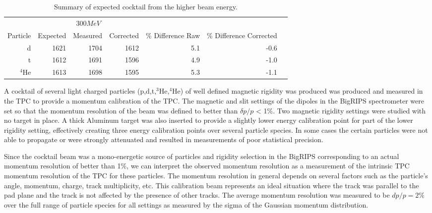 \begin{table*}\centering
{}
\begin{tabular}{@{}rrrrrrr@{}}\toprule
& \multicolumn{3}{c}{$300 MeV$}\\
\cmidrule{2-4}
Particle & Expected & Measured & Corrected & \% Difference Raw & \% Difference Corrected\\
\midrule
d   & 1621 & 1704 & 1612   &  5.1 & -0.6  \\
t   & 1612 & 1691 & 1596   &  4.9  & -1.0\\
${}^{4}$He   & 1613 & 1698 &  1595 & 5.3 & -1.1\\

\bottomrule
\end{tabular}
\caption{Summary of expected cocktail from the higher beam energy.}
\label{tb:cocktail300}
\end{table*}

A cocktail of several light charged particles (p,d,t,${}^{3}$He,${}^{4}$He) of well defined magnetic rigidity was produced was produced and measured in the TPC to provide a momentum calibration of the TPC. The magnetic and slit settings of the dipoles in the BigRIPS spectrometer were set so that the momentum resolution of the beam was defined to better than $\delta p/p$ < 1\%. Two magnetic rigidity settings were studied with no target in place. A thick Aluminum target was also inserted to provide a slightly lower energy calibration point for part of the lower rigidity setting, effectively creating three energy calibration points over several particle species. In some cases the certain particles were not able to propagate or were strongly attenuated and resulted in measurements of poor statistical precision. 

Since the cocktail beam was a mono-energetic source of particles and rigidity selection in the BigRIPS corresponding to an actual momentum resolution of better than 1\%, we can interpret the  observed momentum resolution as a measurement of the intrinsic TPC momentum resolution of the TPC for these particles. The momentum resolution in general depends on several factors such as the particle's angle, momentum, charge, track multiplicity, etc. This calibration beam represents an ideal situation where the track was parallel to the pad plane and the track is not affected by the presence of other tracks. The average momentum resolution was measured to be $dp/p = 2\%$ over the full range of particle species for all settings as measured by the sigma of the Gaussian momentum distribution. 

